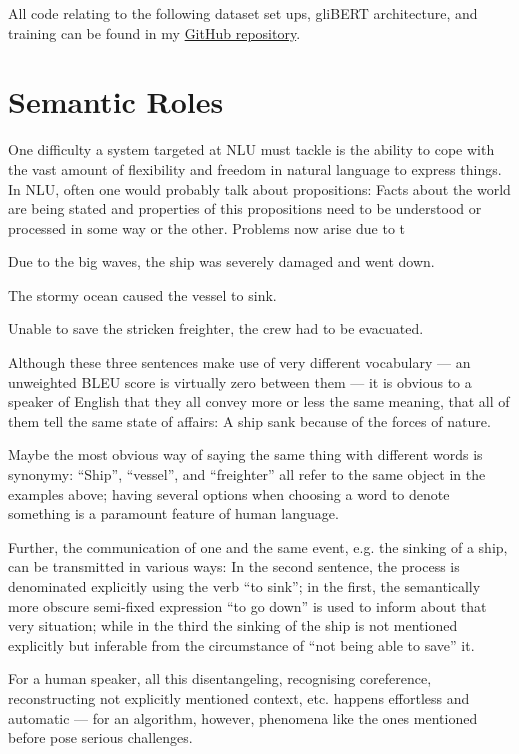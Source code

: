 All code relating to the following dataset set ups, gliBERT architecture, and training can be found in
my \href{https://github.com/JonathanSchaber/Masterarbeit}{GitHub repository}.


\section{Semantic Roles}

One difficulty a system targeted at NLU must tackle is the ability to cope with the vast amount of
flexibility and freedom in natural language to express things. In NLU, often one would probably
talk about propositions: Facts about the world are being stated and properties of this propositions
need to be understood or processed in some way or the other.
{\color{red} Problems now arise due to t}

\begin{examples}
  \label{ex:semantics}
  \item Due to the big waves, the ship was severely damaged and went down.
  \item The stormy ocean caused the vessel to sink.
  \item Unable to save the stricken freighter, the crew had to be evacuated.
\end{examples}

Although these three sentences make use of very different vocabulary --- an unweighted BLEU score
is virtually zero between them --- it is obvious to a speaker of English that they all convey more
or less the same meaning, that all of them tell the same state of affairs: A ship sank because of the
forces of nature.

Maybe the most obvious way of saying the same thing with different words is synonymy: ``Ship'',
``vessel'', and ``freighter'' all refer to the same object in the examples above; having several
options when choosing a word to denote something is a paramount feature of human language.

Further, the communication of one and the same event, e.g. the sinking
of a ship, can be transmitted in various ways: In the second sentence,
the process is denominated explicitly using the verb ``to sink''; in
the first, the semantically more obscure semi-fixed expression ``to go
down'' is used to inform about that very situation; while in the third
the sinking of the ship is not mentioned explicitly but inferable from
the circumstance of ``not being able to save'' it.

For a human speaker, all this disentangeling, recognising coreference,
reconstructing not explicitly mentioned context, etc. happens effortless
and automatic --- for an algorithm, however, phenomena like the ones
mentioned before pose serious challenges.

